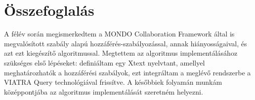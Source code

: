 \chapter{Összefoglalás}
A félév során megismerkedtem a MONDO Collaboration Framework által is megvalósított szabály alapú hozzáférés-szabályozással, annak hiányosságaival, és azt ezt kiegészítő algoritmussal. Megtettem az algoritmus implementálásához szükséges első lépéseket: definiáltam egy Xtext nyelvtant, amellyel meghatározhatók a hozzáférési szabályok, ezt integráltam a meglévő rendszerbe a VIATRA Query technológiával frissítve. A későbbiek folyamán munkám középpontjába az algoritmus implementálását szeretném helyezni.